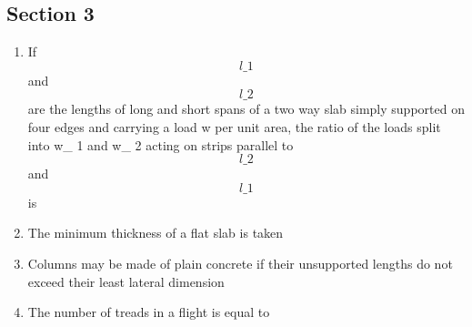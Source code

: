 \documentclass[11pt,a4paper]{article}
\begin{document}
\subsection*{Section 3}
\begin{enumerate}
\item{If $${{l\_1}}$$ and $${{l\_2}}$$ are the lengths of long and short spans of a two way slab simply supported on four edges and carrying a load w per unit area, the ratio of the loads split into w\_ 1 and w\_ 2 acting on strips parallel to $${{l\_2}}$$ and $${{l\_1}}$$ is
}
\\
\item{The minimum thickness of a flat slab is taken}
\\
\item{Columns may be made of plain concrete if their unsupported lengths do not exceed their least lateral dimension}
\\
\item{The number of treads in a flight is equal to}

\end{enumerate}
\end{document}
